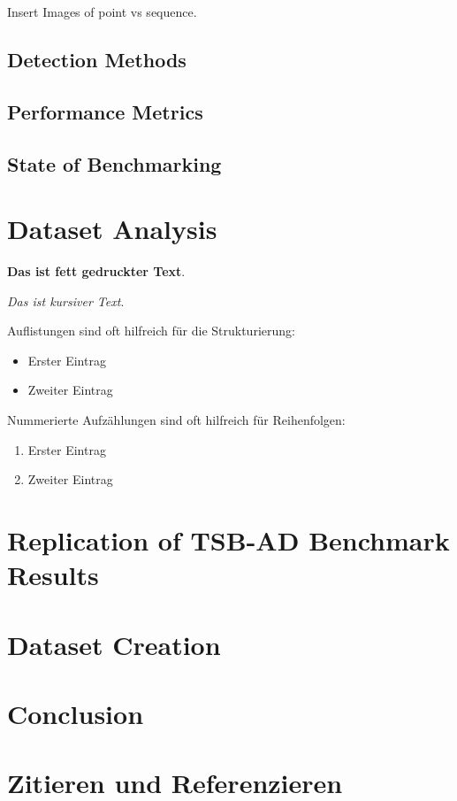 \documentclass[12pt,oneside]{article}
\begin{document}
Insert Images of point vs sequence.


\subsection{Detection Methods}
\subsection{Performance Metrics}

\subsection{State of Benchmarking}

\section{Dataset Analysis}

\textbf{Das ist fett gedruckter Text}.

\textit{Das ist kursiver Text}.


Auflistungen sind oft hilfreich für die Strukturierung:
\begin{itemize}
    \item Erster Eintrag
    \item Zweiter Eintrag
\end{itemize}

Nummerierte Aufzählungen sind oft hilfreich für Reihenfolgen:
\begin{enumerate}
    \item Erster Eintrag
    \item Zweiter Eintrag
\end{enumerate}

\section{Replication of TSB-AD Benchmark Results}

\section{Dataset Creation}

\section{Conclusion}

\section{Zitieren und Referenzieren}
\end{document}
